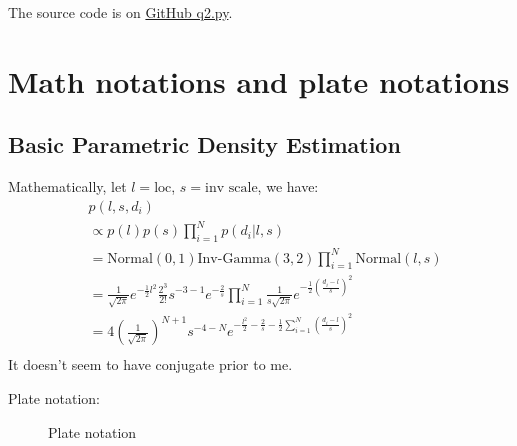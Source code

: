 The source code is on \href{https://github.com/liusida/ds2/blob/main/assignment3/code/q2.py}{GitHub q2.py}.

\newpage
\section{Math notations and plate notations}
\subsection{Basic Parametric Density Estimation}
Mathematically, let $l=\text{loc}$, $s=\text{inv scale}$, we have:
\begin{align*}
     & p(l, s, d_i)                                                                                                                                                \\
     & \propto p(l)p(s)\prod_{i=1}^N p(d_i|l,s)                                                                                                                    \\
     & = \text{Normal}(0,1) \text{Inv-Gamma}(3,2) \prod_{i=1}^N \text{Normal}(l, s)                                                                                \\
     & = \frac{1}{\sqrt{2\pi}}e^{-\frac{1}{2}l^2} \frac{2^3}{2!}s^{-3-1} e^{-\frac{2}{s}} \prod_{i=1}^N \frac{1}{s\sqrt{2\pi}} e^{-\frac{1}{2}(\frac{d_i-l}{s})^2} \\
     & = 4 (\frac{1}{\sqrt{2\pi}})^{N+1} s^{-4-N} e^{-\frac{l^2}{2} -\frac{2}{s} - \frac{1}{2}\sum_{i=1}^N (\frac{d_i-l}{s})^2}                          \\
\end{align*}
It doesn't seem to have conjugate prior to me.

Plate notation:
\begin{figure}[h]
    \centering
    \caption{Plate notation}
\end{figure}

